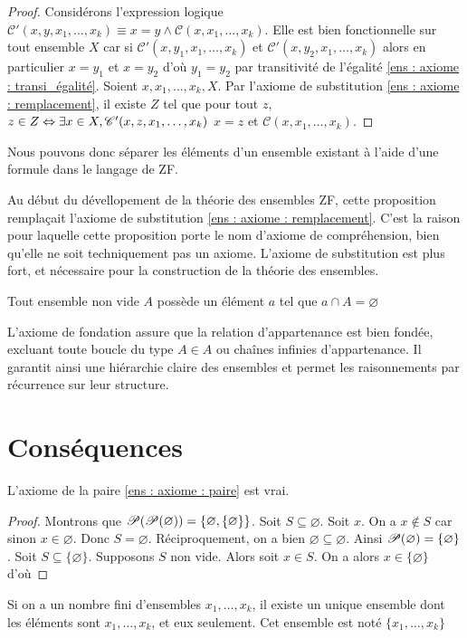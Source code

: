 \begin{proof}
    Considérons l'expression logique $\mathscr{C}'(x,y,x_1,\dotsc ,x_k)\equiv x=y\land \mathscr{C}(x,x_1,\dotsc ,x_k)$. Elle est bien fonctionnelle sur tout ensemble $X$ car si $\mathscr{C}'(x,y_1,x_1,\dotsc ,x_k)$ et $\mathscr{C}'(x,y_2,x_1,\dotsc ,x_k)$ alors en particulier $x=y_1$ et $x=y_2$ d'où $y_1 = y_2$ par transitivité de l'égalité \ref{ens : axiome : transi_égalité}. Soient $x,x_1,\dots, x_k, X$. Par l'axiome de substitution \ref{ens : axiome : remplacement}, il existe $Z$ tel que pour tout $z$, $z\in Z\Leftrightarrow \exists x\in X,  \mathscr C'(x,z,x_1,\dots, x_k)$ \ie $x = z $ et $\mathscr C(x,x_1,\dots, x_k)$.
\end{proof}
Nous pouvons donc séparer les éléments d'un ensemble existant à l'aide d'une formule dans le langage de ZF.
\begin{remarque}
    Au début du dévellopement de la théorie des ensembles ZF, cette proposition remplaçait l'axiome de substitution \ref{ens : axiome : remplacement}. C'est la raison pour laquelle cette proposition porte le nom d'axiome de compréhension, bien qu'elle ne soit techniquement pas un axiome. L'axiome de substitution est plus fort, et nécessaire pour la construction de la théorie des ensembles.
\end{remarque}


\begin{axiome}[de fondation]\label{ens : axiome : fondation}
	Tout ensemble non vide $A$ possède un élément $a$ tel que $a\cap A = \varnothing$
\end{axiome}
L’axiome de fondation assure que la relation d’appartenance est bien fondée, excluant toute boucle du type 
$A\in A$ ou chaînes infinies d’appartenance. Il garantit ainsi une hiérarchie claire des ensembles et permet les raisonnements par récurrence sur leur structure.

\section*{Conséquences}
\begin{proposition}\label{ens : axiome : preuve_paire}

    L'axiome de la paire \ref{ens : axiome : paire} est vrai.
\end{proposition}
\begin{proof}
    Montrons que $\mathscr{P}(\mathscr{P}(\varnothing)) = \{\varnothing,\{\varnothing\}\}$. Soit $S\subseteq\varnothing$. Soit $x$. On a $x\notin S$ car sinon $x\in \varnothing$. Donc $S = \varnothing$. Réciproquement, on a bien $\varnothing\subseteq\varnothing$. Ainsi $\mathscr{P}(\varnothing) = \{\varnothing\}$. Soit $S\subseteq \{\varnothing\}$. Supposons $S$ non vide. Alors soit $x\in S$. On a alors $x\in \{\varnothing\}$ d'où 
\end{proof}
\begin{proposition}
	Si on a un nombre fini d'ensembles $x_1, \dotsc , x_k$, il existe un unique ensemble dont les éléments sont $x_1, \dotsc, x_k$, et eux seulement. Cet ensemble est noté $\{x_1, \dotsc , x_k\}$
\end{proposition}

